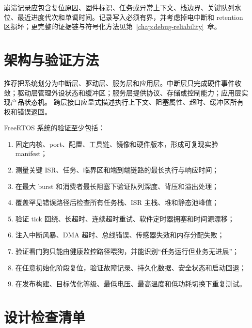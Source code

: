 崩溃记录应包含复位原因、固件标识、任务或异常上下文、栈边界、关键队列水位、最近进度代次和单调时间。记录写入必须有界，并考虑掉电中断和 retention 区损坏；更完整的证据链与符号化方法见第~\ref{chap:debug-reliability}~章。

\section{架构与验证方法}

推荐把系统划分为中断层、驱动层、服务层和应用层。中断层只完成硬件事件收敛；驱动层管理外设状态和缓冲区；服务层提供协议、存储或控制能力；应用层实现产品状态机。
跨层接口应显式描述执行上下文、阻塞属性、超时、缓冲区所有权和错误返回。

FreeRTOS 系统的验证至少包括：
\begin{enumerate}
  \item 固定内核、port、配置、工具链、镜像和硬件版本，形成可复现实验 manifest；
  \item 测量关键 ISR、任务、临界区和端到端链路的最长执行与响应时间；
  \item 在最大 burst 和消费者最长阻塞下验证队列深度、背压和溢出处理；
  \item 覆盖罕见错误路径后检查所有任务栈、ISR 主栈、堆和静态池峰值；
  \item 验证 tick 回绕、长超时、连续超时重试、软件定时器拥塞和时间源漂移；
  \item 注入中断风暴、DMA 超时、总线错误、传感器失效和内存分配失败；
  \item 验证看门狗只能由健康监控路径喂狗，并能识别“任务运行但业务无进展”；
  \item 在任意初始化阶段复位，验证故障记录、持久化数据、安全状态和启动回退；
  \item 在发布构建、目标优化等级、最低电压、最高温度和低功耗切换下重复测试。
\end{enumerate}

\newpage
\section{设计检查清单}

